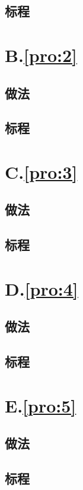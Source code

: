 \documentclass[
	lang=cn,
	color=blue
]{elegantbook}
\begin{document}
\section*{标程}

\chapter*{B.\quad \ref*{pro:2}}
\section*{做法}

\section*{标程}

\chapter*{C.\quad \ref*{pro:3}}
\section*{做法}

\section*{标程}

\chapter*{D.\quad \ref*{pro:4}}
\section*{做法}

\section*{标程}

\chapter*{E.\quad \ref*{pro:5}}
\section*{做法}

\section*{标程}
\end{document}
